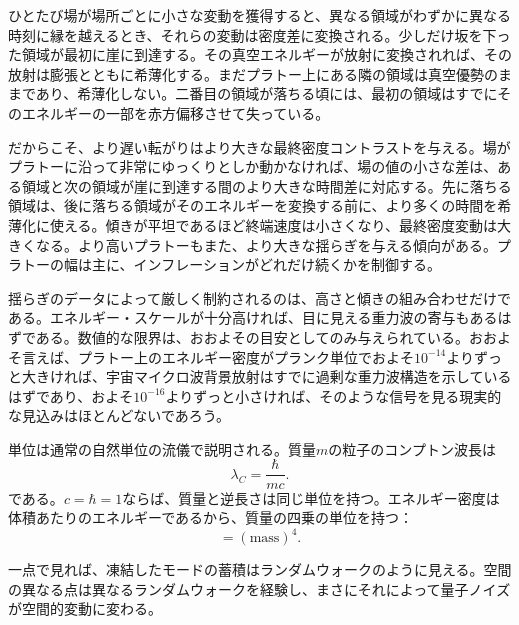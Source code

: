 ひとたび場が場所ごとに小さな変動を獲得すると、異なる領域がわずかに異なる時刻に縁を越えるとき、それらの変動は密度差に変換される。少しだけ坂を下った領域が最初に崖に到達する。その真空エネルギーが放射に変換されれば、その放射は膨張とともに希薄化する。まだプラトー上にある隣の領域は真空優勢のままであり、希薄化しない。二番目の領域が落ちる頃には、最初の領域はすでにそのエネルギーの一部を赤方偏移させて失っている。

だからこそ、より遅い転がりはより大きな最終密度コントラストを与える。場がプラトーに沿って非常にゆっくりとしか動かなければ、場の値の小さな差は、ある領域と次の領域が崖に到達する間のより大きな時間差に対応する。先に落ちる領域は、後に落ちる領域がそのエネルギーを変換する前に、より多くの時間を希薄化に使える。傾きが平坦であるほど終端速度は小さくなり、最終密度変動は大きくなる。より高いプラトーもまた、より大きな揺らぎを与える傾向がある。プラトーの幅は主に、インフレーションがどれだけ続くかを制御する。

揺らぎのデータによって厳しく制約されるのは、高さと傾きの組み合わせだけである。エネルギー・スケールが十分高ければ、目に見える重力波の寄与もあるはずである。数値的な限界は、おおよその目安としてのみ与えられている。おおよそ言えば、プラトー上のエネルギー密度がプランク単位でおよそ\(10^{-14}\)よりずっと大きければ、宇宙マイクロ波背景放射はすでに過剰な重力波構造を示しているはずであり、およそ\(10^{-16}\)よりずっと小さければ、そのような信号を見る現実的な見込みはほとんどないであろう。

単位は通常の自然単位の流儀で説明される。質量\(m\)の粒子のコンプトン波長は
\begin{equation}
\lambda_C=\frac{\hbar}{mc}.
\end{equation}
である。\(c=\hbar=1\)ならば、質量と逆長さは同じ単位を持つ。エネルギー密度は体積あたりのエネルギーであるから、質量の四乗の単位を持つ：
\begin{equation}
[\rho]=(\mathrm{mass})^4.
\end{equation}

一点で見れば、凍結したモードの蓄積はランダムウォークのように見える。空間の異なる点は異なるランダムウォークを経験し、まさにそれによって量子ノイズが空間的変動に変わる。

\begin{classroomqa}
\end{classroomqa}

